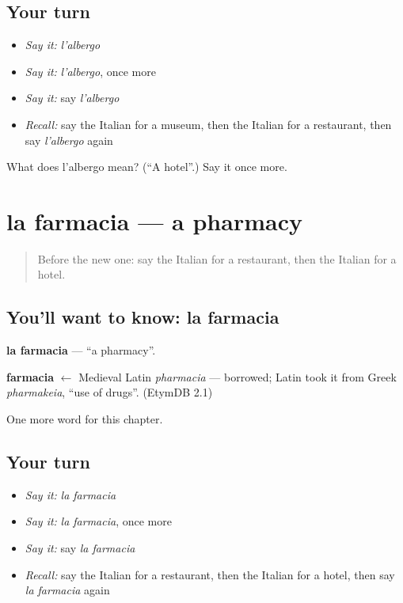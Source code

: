 \subsection*{Your turn}
\begin{itemize}
\raggedright
  \item \emph{Say it:} \emph{l'albergo}
  \item \emph{Say it:} \emph{l'albergo}, once more
  \item \emph{Say it:} say \emph{l'albergo}
  \item \emph{Recall:} say the Italian for a museum, then the Italian for a restaurant, then say \emph{l'albergo} again
\end{itemize}

\begin{tcolorbox}[breakable,colback=teal!4,colframe=teal!35!black,title={Before you move on}]
What does l'albergo mean? (\textquotedblleft{}A hotel\textquotedblright{}.) Say it once more.
\end{tcolorbox}
\section[la farmacia]{la farmacia — a pharmacy}

\label{lesson:IT-C84-farmacia}



\begin{quote}
Before the new one: say the Italian for a restaurant, then the Italian for a hotel.
\end{quote}

\subsection*{You'll want to know: la farmacia}
\textbf{la farmacia} — \textquotedblleft{}a pharmacy\textquotedblright{}.

\begin{cousinweb}
\textbf{farmacia} $\leftarrow$ Medieval Latin \emph{pharmacia} — borrowed; Latin took it from Greek \emph{pharmakeia}, \textquotedblleft{}use of drugs\textquotedblright{}. (EtymDB 2.1)
\end{cousinweb}

\begin{grammarlens}[title={What you've built}]
One more word for this chapter.
\end{grammarlens}

\subsection*{Your turn}
\begin{itemize}
\raggedright
  \item \emph{Say it:} \emph{la farmacia}
  \item \emph{Say it:} \emph{la farmacia}, once more
  \item \emph{Say it:} say \emph{la farmacia}
  \item \emph{Recall:} say the Italian for a restaurant, then the Italian for a hotel, then say \emph{la farmacia} again
\end{itemize}

